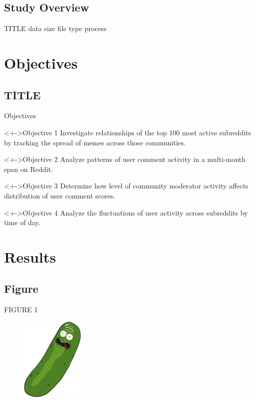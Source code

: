 \documentclass{beamer}
\begin{document}
\subsection{Study Overview} %
\begin{frame}{TITLE}
data size
file type
process
\end{frame}

\section{Objectives}

\subsection{TITLE}

\begin{frame}{Objectives}

\begin{block}<+->{Objective 1} 
Investigate relationships of the top 100 most active subreddits by tracking the spread of memes across those communities.
\end{block}

\begin{block}<+->{Objective 2} 
Analyze patterns of user comment activity in a multi-month span on Reddit.
\end{block}

\begin{block}<+->{Objective 3}
Determine how level of community moderator activity affects distribution of user comment scores.
\end{block}

\begin{block}<+->{Objective 4}
Analyze the fluctuations of user activity across subreddits by time of day.
\end{block}
\end{frame}

\section{Results} %

\subsection{Figure}

\begin{frame}{FIGURE 1 }

    \begin{figure}
      {
        \includegraphics[width=30mm,scale=0.5]{Plots/picklerick_6}
      }
    \end{figure}

\end{frame}
\end{document}
